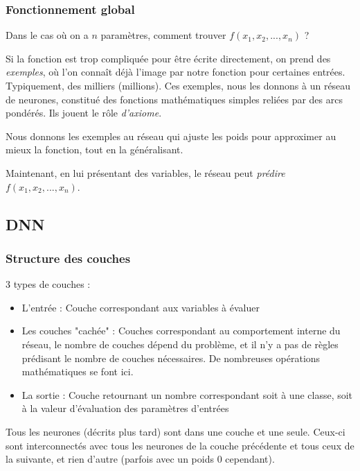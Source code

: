 \documentclass[compress]{beamer}
\begin{document}
			
			\begin{frame}
				\frametitle{Fonctionnement global}
					Dans le cas où on a $n$ paramètres, comment trouver $f(x_1, x_2, ..., x_n)$ ?
				
				
					Si la fonction est trop compliquée pour être écrite directement, on prend des \emph{exemples}, où l'on connaît déjà l'image par notre fonction pour certaines entrées. Typiquement, des milliers (millions). Ces exemples, nous les donnons à un réseau de neurones, constitué des fonctions mathématiques simples reliées par des arcs pondérés. Ils jouent le rôle \emph{d'axiome}.
					
					
					Nous donnons les exemples au réseau qui ajuste les poids pour approximer au mieux la fonction, tout en la généralisant.
					
					
					Maintenant, en lui présentant des variables, le réseau peut \emph{prédire} $f(x_1, x_2, ..., x_n)$.
			\end{frame}


		\subsection{DNN}
			\begin{frame}
				\frametitle{Structure des couches}
				3 types de couches :
				\begin{itemize}
					\item L'entrée : Couche correspondant aux variables à évaluer
					\item Les couches "cachée" : Couches correspondant au comportement interne du réseau, le nombre de couches dépend du problème, et il n'y a pas de règles prédisant le nombre de couches nécessaires. De nombreuses opérations mathématiques se font ici.
					\item La sortie : Couche retournant un nombre correspondant soit à une classe, soit à la valeur d'évaluation des paramètres d'entrées
				\end{itemize}
				
				Tous les neurones (décrits plus tard) sont dans une couche et une seule. Ceux-ci sont interconnectés avec tous les neurones de la couche précédente et tous ceux de la suivante, et rien d'autre (parfois avec un poids 0 cependant).
				
			\end{frame}
\end{document}
